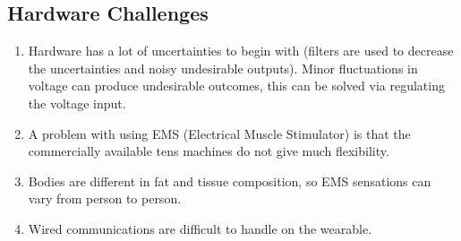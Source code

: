 \subsection{Hardware Challenges}
\begin{enumerate}
  \item Hardware has a lot of uncertainties to begin with (filters are used to decrease the uncertainties and noisy undesirable outputs). Minor fluctuations in voltage can produce undesirable outcomes, this can be solved via regulating the voltage input.
  
  \item A problem with using EMS (Electrical Muscle Stimulator) is that the commercially available tens machines do not give much flexibility. 
  
  \item Bodies are different in fat and tissue composition, so EMS sensations can vary from person to person.

  \item Wired communications are difficult to handle on the wearable.
  
\end{enumerate}